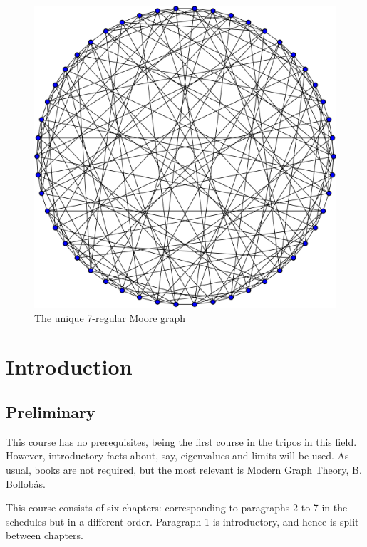 \documentclass{article}
\begin{document}
\maketitle

\tableofcontents

\vspace{20mm}
\begin{figure}[h]
    \centering
    \includegraphics[scale=0.15]{hoffman_singleton}
    \caption*{The unique \hyperlink{def:regular}{7-regular} \hyperlink{def:moore}{Moore} graph}
    \label{fig:hsgraph}
\end{figure}
\clearpage
\section{Introduction}

\subsection{Preliminary}
This course has no prerequisites, being the first course in the tripos in this field.  However, introductory facts about, say, eigenvalues and limits will be used.
As usual, books are not required, but the most relevant is Modern Graph Theory, B. Bollob\'as.

This course consists of six chapters: corresponding to paragraphs 2 to 7 in the schedules but in a different order. Paragraph 1 is introductory, and hence is split between chapters.
\end{document}
